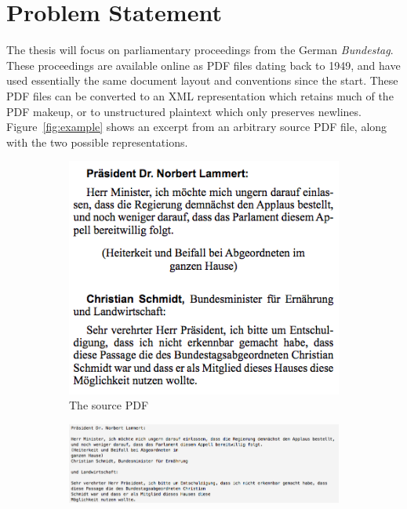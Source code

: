 \chapter{Problem Statement}
The thesis will focus on parliamentary proceedings from the German
\emph{Bundestag}. These proceedings are available online as PDF files dating
back to 1949, and have used essentially the same document layout and conventions
since the start. These PDF files can be converted to an XML representation which
retains much of the PDF makeup, or to unstructured plaintext which only
preserves newlines. Figure~\ref{fig:example} shows an excerpt from an arbitrary
source PDF file, along with the two possible representations.

\begin{figure}[htbp]
  \centering
  \begin{subfigure}[b]{0.4\textwidth} 
    \centering
    \includegraphics[width=\textwidth]{figures/source.png}
    \caption{The source PDF}
  \end{subfigure}
  \begin{subfigure}[b]{0.59\textwidth}
	\centering
    \includegraphics[width=\textwidth]{figures/plain.png}

\end{subfigure}
\end{figure}
